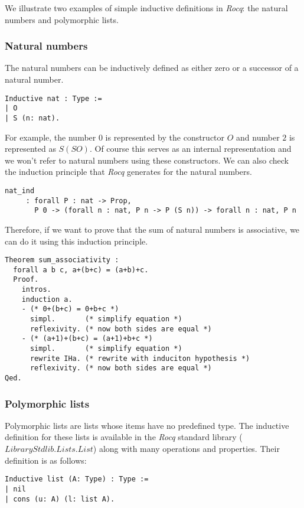We illustrate two examples of simple inductive definitions in \textit{Rocq}: the natural numbers and polymorphic lists.

\subsubsection{Natural numbers}
The natural numbers can be inductively defined as either zero or a successor of a natural number.
\begin{lstlisting}[language=Coq]
Inductive nat : Type :=
| O
| S (n: nat).
\end{lstlisting}

For example, the number $0$ is represented by the constructor \lst$O$ and number $2$ is represented as \lst$S (S O)$.
Of course this serves as an internal representation and we won't refer to natural numbers using these constructors.
We can also check the induction principle that \textit{Rocq} generates for the natural numbers.
\begin{lstlisting}[language=Coq]
  nat_ind
     : forall P : nat -> Prop,
       P 0 -> (forall n : nat, P n -> P (S n)) -> forall n : nat, P n
\end{lstlisting}

Therefore, if we want to prove that the sum of natural numbers is associative, we can do it using this induction principle.
\begin{lstlisting}[language=Coq]
Theorem sum_associativity :
  forall a b c, a+(b+c) = (a+b)+c.
  Proof.
    intros.
    induction a.
    - (* 0+(b+c) = 0+b+c *)
      simpl.       (* simplify equation *)
      reflexivity. (* now both sides are equal *)        
    - (* (a+1)+(b+c) = (a+1)+b+c *)
      simpl.       (* simplify equation *)
      rewrite IHa. (* rewrite with induciton hypothesis *)
      reflexivity. (* now both sides are equal *)
Qed.
\end{lstlisting}

\subsubsection{Polymorphic lists}
Polymorphic lists are lists whose items have no predefined type.
The inductive definition for these lists is available in the \textit{Rocq} standard library (\lst$Library Stdlib.Lists.List$) along with many operations and properties.
Their definition is as follows: 

\begin{lstlisting}[language=Coq]
Inductive list (A: Type) : Type :=
| nil
| cons (u: A) (l: list A).
\end{lstlisting}

